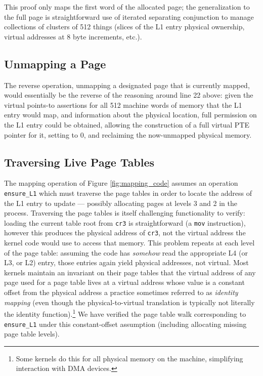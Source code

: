 This proof only maps the first word of the allocated page; the generalization to the full page
is straightforward use of iterated separating conjunction to manage collections of clusters of 512 things
(slices of the L1 entry physical ownership, virtual addresses at 8 byte increments, etc.).

\subsection{Unmapping a Page}
The reverse operation, unmapping a designated page that is currently mapped,
would essentially be the reverse of
the reasoning around line 22 above: given the virtual points-to assertions for all 512
machine words of memory that the L1 entry would map,
and information about the physical location, 
full permission on the L1 entry could be obtained, allowing the construction of a
full virtual PTE pointer for it, setting to 0, and reclaiming the now-unmapped physical memory.

\subsection{Traversing Live Page Tables}
The mapping operation of Figure \ref{fig:mapping_code} assumes an operation \lstinline|ensure_L1| which must traverse the page tables
in order to locate the address of the L1 entry to update --- possibly allocating pages at levels 3 and 2 in the process.
Traversing the page tables is itself challenging functionality to verify: loading the current table root from \lstinline|cr3| is straightforward
(a \lstinline|mov| instruction), however this produces the physical address of \lstinline|cr3|, not the virtual address the kernel code would use to access that memory.
This problem repeats at each level of the page table: assuming the code has \emph{somehow} read the appropriate L4 (or L3, or L2) entry, those entries again
yield physical addresses, not virtual.
Most kernels maintain an invariant on their page tables that the virtual address of any page used for a page table lives at a virtual address
whose value is a constant offset from the physical address a practice sometimes referred to as \emph{identity mapping} (even though the physical-to-virtual translation
is typically not literally the identity function).\footnote{Some kernels do this for all physical memory on the machine, simplifying interaction
with DMA devices.}
We have verified the page table walk corresponding to \lstinline|ensure_L1| under this constant-offset assumption (including allocating missing page table levels).

